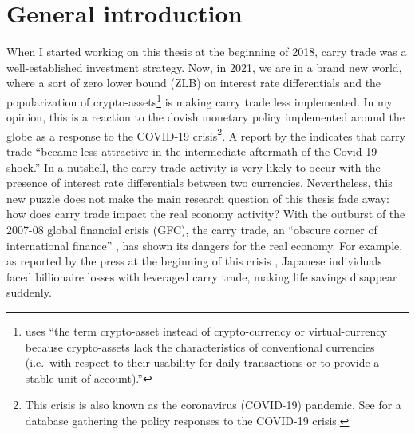 \documentclass[a4paper, twoside]{templates/ociamthesis}
\begin{document}
\flushbottom

\hypertarget{general-introduction}{%
\chapter*{General introduction}\label{general-introduction}}

\adjustmtc
{}

\noindent When I started working on this thesis at the beginning of 2018, carry trade was a well-established investment strategy. Now, in 2021, we are in a brand new world, where a sort of zero lower bound (ZLB) on interest rate differentials and the popularization of crypto-assets\footnote{\textcite[ 65]{stix2021} uses ``the term crypto-asset instead of crypto-currency or virtual-currency because crypto-assets lack the characteristics of conventional currencies (i.e.~with respect to their usability for daily transactions or to provide a stable unit of account).''} is making carry trade less implemented. In my opinion, this is a reaction to the dovish monetary policy implemented around the globe as a response to the COVID-19 crisis\footnote{This crisis is also known as the coronavirus (COVID-19) pandemic. See \textcite{cantu2021} for a database gathering the policy responses to the COVID-19 crisis.}. A report by the \textcite[ 12]{committeeontheglobalfinancialsystemcgfs2021} indicates that carry trade ``became less attractive in the intermediate aftermath of the Covid-19 shock.'' In a nutshell, the carry trade activity is very likely to occur with the presence of interest rate differentials between two currencies. Nevertheless, this new puzzle does not make the main research question of this thesis fade away: how does carry trade impact the real economy activity? With the outburst of the 2007-08 global financial crisis (GFC), the carry trade, an ``obscure corner of international finance'' \autocite[  74]{jorda2012}, has shown its dangers for the real economy. For example, as reported by the press at the beginning of this crisis \autocite{fackler2007}, Japanese individuals faced billionaire losses with leveraged carry trade, making life savings disappear suddenly.
\end{document}
